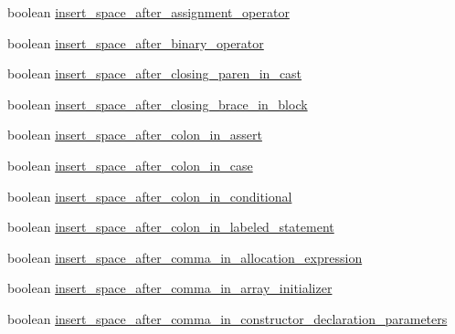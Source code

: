 \begin{DoxyCompactItemize}
\item 
boolean \hyperlink{classorg_1_1eclipse_1_1jdt_1_1ui_1_1tests_1_1refactoring_1_1infra_1_1TestFormatterOptions_a3c87e38fba9f640514baa11ea630f3af}{insert\_\-space\_\-after\_\-assignment\_\-operator}
\item 
boolean \hyperlink{classorg_1_1eclipse_1_1jdt_1_1ui_1_1tests_1_1refactoring_1_1infra_1_1TestFormatterOptions_abf7851f91c06ad47ac05ed46b7370c63}{insert\_\-space\_\-after\_\-binary\_\-operator}
\item 
boolean \hyperlink{classorg_1_1eclipse_1_1jdt_1_1ui_1_1tests_1_1refactoring_1_1infra_1_1TestFormatterOptions_a65faab5d41738b2614ad6a2b94001ac7}{insert\_\-space\_\-after\_\-closing\_\-paren\_\-in\_\-cast}
\item 
boolean \hyperlink{classorg_1_1eclipse_1_1jdt_1_1ui_1_1tests_1_1refactoring_1_1infra_1_1TestFormatterOptions_ab484c1d3f245a5bcdde84519174e3bcb}{insert\_\-space\_\-after\_\-closing\_\-brace\_\-in\_\-block}
\item 
boolean \hyperlink{classorg_1_1eclipse_1_1jdt_1_1ui_1_1tests_1_1refactoring_1_1infra_1_1TestFormatterOptions_a04253a6ec2d0a5e9ee7797a92e7191e6}{insert\_\-space\_\-after\_\-colon\_\-in\_\-assert}
\item 
boolean \hyperlink{classorg_1_1eclipse_1_1jdt_1_1ui_1_1tests_1_1refactoring_1_1infra_1_1TestFormatterOptions_a030aa197e5fea4da4c48207505676655}{insert\_\-space\_\-after\_\-colon\_\-in\_\-case}
\item 
boolean \hyperlink{classorg_1_1eclipse_1_1jdt_1_1ui_1_1tests_1_1refactoring_1_1infra_1_1TestFormatterOptions_a0344fecd10ffe37f96873aad8f8d687b}{insert\_\-space\_\-after\_\-colon\_\-in\_\-conditional}
\item 
boolean \hyperlink{classorg_1_1eclipse_1_1jdt_1_1ui_1_1tests_1_1refactoring_1_1infra_1_1TestFormatterOptions_aed11e0a58aa3b70326bd902d7d267175}{insert\_\-space\_\-after\_\-colon\_\-in\_\-labeled\_\-statement}
\item 
boolean \hyperlink{classorg_1_1eclipse_1_1jdt_1_1ui_1_1tests_1_1refactoring_1_1infra_1_1TestFormatterOptions_a55013023b040447452051a5e09c359ca}{insert\_\-space\_\-after\_\-comma\_\-in\_\-allocation\_\-expression}
\item 
boolean \hyperlink{classorg_1_1eclipse_1_1jdt_1_1ui_1_1tests_1_1refactoring_1_1infra_1_1TestFormatterOptions_a7b00690df1aa730fce967f6782d68855}{insert\_\-space\_\-after\_\-comma\_\-in\_\-array\_\-initializer}
\item 
boolean \hyperlink{classorg_1_1eclipse_1_1jdt_1_1ui_1_1tests_1_1refactoring_1_1infra_1_1TestFormatterOptions_a2c94522453be460009751021fdb84021}{insert\_\-space\_\-after\_\-comma\_\-in\_\-constructor\_\-declaration\_\-parameters}

\end{DoxyCompactItemize}
